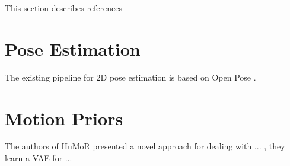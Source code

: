 
This section describes references

\section{Pose Estimation}
The existing pipeline for 2D pose estimation is based on Open Pose \cite{openPose}.


\section{Motion Priors}

The authors of HuMoR \cite{rempe2021humor} presented a novel approach for dealing with ... , they learn a VAE for ...